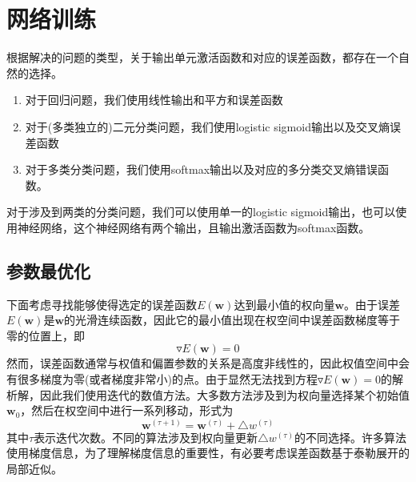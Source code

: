 \section{网络训练}
根据解决的问题的类型，关于输出单元激活函数和对应的误差函数，都存在一个自然的选择。
\begin{enumerate}
	\item 对于回归问题，我们使用线性输出和平方和误差函数
	\item 对于(多类独立的)二元分类问题，我们使用logistic sigmoid输出以及交叉熵误差函数
	\item 对于多类分类问题，我们使用softmax输出以及对应的多分类交叉熵错误函数。
\end{enumerate}
对于涉及到两类的分类问题，我们可以使用单一的logistic sigmoid输出，也可以使用神经网络，这个神经网络有两个输出，且输出激活函数为softmax函数。
\subsection*{参数最优化}
下面考虑寻找能够使得选定的误差函数$E(\boldsymbol{w})$达到最小值的权向量$\boldsymbol{w}$。由于误差$E(\boldsymbol{w})$是$\boldsymbol{w}$的光滑连续函数，因此它的最小值出现在权空间中误差函数梯度等于零的位置上，即
\begin{equation}
	\triangledown E(\boldsymbol{w})=0
\end{equation}
然而，误差函数通常与权值和偏置参数的关系是高度非线性的，因此权值空间中会有很多梯度为零(或者梯度非常小)的点。由于显然无法找到方程$\triangledown E(\boldsymbol{w})=0$的解析解，因此我们使用迭代的数值方法。大多数方法涉及到为权向量选择某个初始值$\boldsymbol{w}_0$，然后在权空间中进行一系列移动，形式为
\begin{equation}
	\boldsymbol{w}^{(\tau +1)}=\boldsymbol{w}^{(\tau)}+\triangle w^{(\tau)}
\end{equation}
其中$\tau$表示迭代次数。不同的算法涉及到权向量更新$\triangle w^{(\tau)}$的不同选择。许多算法使用梯度信息，为了理解梯度信息的重要性，有必要考虑误差函数基于泰勒展开的局部近似。

